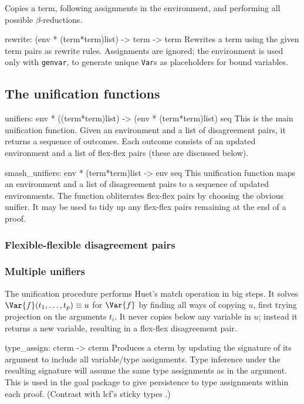 Copies a term, 
following assignments in the environment,
and performing all possible \(\beta\)-reductions.

\beginprog
rewrite: (env * (term*term)list) -> term -> term
\endprog
Rewrites a term using the given term pairs as rewrite rules.  Assignments
are ignored; the environment is used only with {\tt genvar}, to generate
unique {\tt Var}s as placeholders for bound variables.


\subsection{The unification functions}


\beginprog
unifiers: env * ((term*term)list) -> (env * (term*term)list) seq
\endprog
This is the main unification function.
Given an environment and a list of disagreement pairs,
it returns a sequence of outcomes.
Each outcome consists of an updated environment and 
a list of flex-flex pairs (these are discussed below).

\beginprog
smash_unifiers: env * (term*term)list -> env seq
\endprog
This unification function maps an environment and a list of disagreement
pairs to a sequence of updated environments. The function obliterates
flex-flex pairs by choosing the obvious unifier. It may be used to tidy up
any flex-flex pairs remaining at the end of a proof.

\subsubsection{Flexible-flexible disagreement pairs}


\subsubsection{Multiple unifiers}
The unification procedure performs Huet's {\sc match} operation
\cite{huet75} in big steps.
It solves \(\Var{f}(t_1,\ldots,t_p) \equiv u\) for \(\Var{f}\) by finding
all ways of copying \(u\), first trying projection on the arguments
\(t_i\).  It never copies below any variable in \(u\); instead it returns a
new variable, resulting in a flex-flex disagreement pair.  


\beginprog
type_assign: cterm -> cterm
\endprog
Produces a cterm by updating the signature of its argument
to include all variable/type assignments.
Type inference under the resulting signature will assume the
same type assignments as in the argument.
This is used in the goal package to give persistence to type assignments
within each proof. 
(Contrast with {\sc lcf}'s sticky types \cite[page 148]{paulson-book}.)


